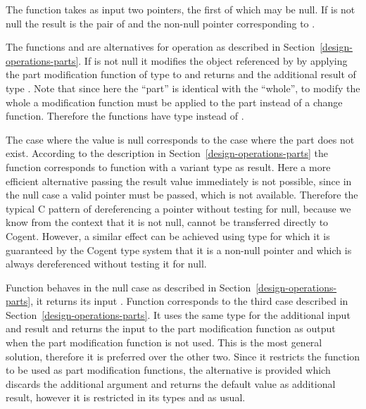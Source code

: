 The function  takes as input two pointers, the first of which may be null. If  is not null 
the result is the pair of  and the non-null pointer corresponding to .

The functions  and  are
alternatives for operation  as described in Section~\ref{design-operations-parts}.
If  is not null it modifies the object referenced by  by applying the part modification function  of type 
 to  and returns  and the additional result of type . Note that since here
the ``part'' is identical with the ``whole'', to modify the whole a modification function must be applied to the part instead of
a change function. Therefore the functions have type  instead of .

The case where the  value is null corresponds to the case where the part does not exist. According to the description in
Section~\ref{design-operations-parts} the function  corresponds to function  with a variant type as result.
Here a more efficient alternative passing the result value immediately is not possible, since in the null case a valid pointer must
be passed, which is not available. Therefore the typical C pattern of dereferencing a pointer without testing for null, because
we know from the context that it is not null, cannot be transferred directly to Cogent. However, a similar effect can be achieved
using type  for which it is guaranteed by the Cogent type system that it is a non-null pointer and which is always dereferenced
without testing it for null. 

Function  behaves in the null case as described in Section~\ref{design-operations-parts}, it returns its input .
Function  corresponds to the third case described in Section~\ref{design-operations-parts}. It uses the same type
for the additional input and result and returns the input to the part modification function as output when the part modification 
function is not used. This is the most general solution, therefore it is preferred over the other two. Since it restricts the function
to be used as part modification functions, the alternative  is provided which discards the additional argument
and returns the default value  as additional result, however it is restricted in its types  and
 as usual.

